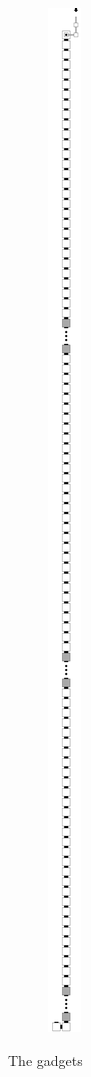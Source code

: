 \begin{figure}[H]
\begin{minipage}[b]{.35\textwidth}
\begin{subfigure}[t]{\textwidth}
        \includegraphics[width=.205\textwidth]{return_paths_read_next_3_op}
        \caption{\label{fig:read_next_3_op}}
      \end{subfigure}%
    \end{minipage}
    \caption{\label{fig:readnext} The {\readnext} gadgets}
\end{figure}

